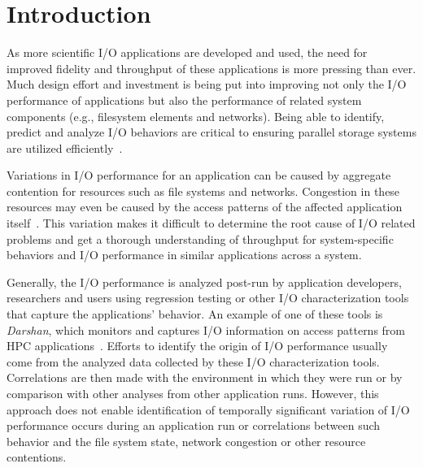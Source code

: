 \section{Introduction}
As more scientific I/O applications are developed and used, the need for
improved fidelity and throughput of these applications is more pressing than ever. 
Much design effort and investment is being put into improving not only
the I/O performance of applications but also the performance of related
system components (e.g., filesystem elements and networks). Being able to
identify, predict and analyze I/O behaviors are critical to ensuring
parallel storage systems are utilized efficiently~\cite{costa2021}. 


Variations in I/O performance for an application can be caused by 
aggregate contention for resources such as file systems and networks. 
Congestion in these resources may even be caused by the access patterns 
of the affected application itself~\cite{I/O-performance-variation}.
This variation
makes it difficult to determine the root cause of I/O related problems
and get a thorough understanding of throughput for system-specific
behaviors and I/O performance in similar applications across a
system. 

Generally, the I/O performance is analyzed post-run by application
developers, researchers and users using regression testing or
other I/O characterization tools that capture the applications' behavior. An example of one of these tools is \emph{Darshan}, which
monitors and captures I/O information on access patterns from HPC
applications~\cite{Darshan}.
Efforts to identify the origin of I/O performance usually come from the analyzed data 
collected by these I/O characterization tools. Correlations are then made with the environment 
in which they were run or by comparison with other analyses from 
other application runs.
However, this approach does not enable identification of
temporally significant variation of I/O performance 
occurs during an application run or
correlations between such behavior and the file system state, 
network congestion or other resource contentions.

